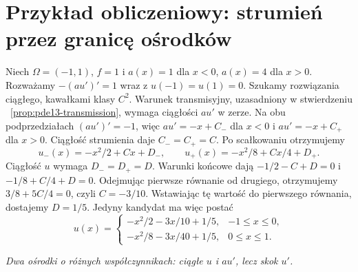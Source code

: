 \section{Przykład obliczeniowy: strumień przez granicę ośrodków}
\label{sec:pde13-transmission}
Niech $\Omega=(-1,1)$, $f=1$ i
$a(x)=1$ dla $x<0$, $a(x)=4$ dla $x>0$.
Rozważamy $-(a u')'=1$ wraz z $u(-1)=u(1)=0$.
Szukamy rozwiązania ciągłego, kawałkami klasy $C^2$.
Warunek transmisyjny, uzasadniony w stwierdzeniu
~\ref{prop:pde13-transmission}, wymaga ciągłości $au'$ w zerze.
Na obu podprzedziałach $(au')'=-1$, więc
$au'=-x+C_-$ dla $x<0$ i $au'=-x+C_+$ dla $x>0$.
Ciągłość strumienia daje $C_-=C_+=C$.
Po scałkowaniu otrzymujemy
\[
 u_-(x)=-x^2/2+Cx+D_-,\qquad
 u_+(x)=-x^2/8+Cx/4+D_+.
\]
Ciągłość $u$ wymaga $D_-=D_+=D$. Warunki końcowe dają
$-1/2-C+D=0$ i $-1/8+C/4+D=0$.
Odejmując pierwsze równanie od drugiego, otrzymujemy
$3/8+5C/4=0$, czyli $C=-3/10$. Wstawiając tę wartość
do pierwszego równania, dostajemy $D=1/5$. Jedyny kandydat ma więc postać
\begin{equation}\label{eq:pde13-exact}
 u(x)=\begin{cases}
 -x^2/2-3x/10+1/5,& -1\le x\le0,\\
 -x^2/8-3x/40+1/5,& 0\le x\le1.
 \end{cases}
\end{equation}
\begin{center}

\small\emph{Dwa ośrodki o różnych współczynnikach: ciągłe $u$ i $a u'$, lecz skok $u'$.}
\end{center}

